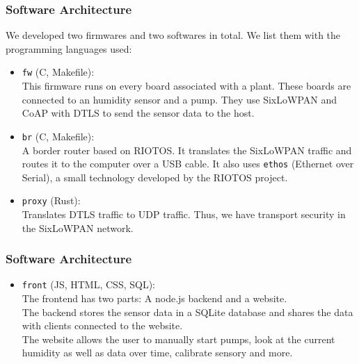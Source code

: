 \documentclass[10pt, xcolor=svgnames]{beamer}
\begin{document}
\begin{frame}
    \frametitle{Software Architecture}

    We developed two firmwares and two softwares in total. We list them with the programming languages used:

    \begin{itemize}
        \item \texttt{fw} (C, Makefile): \\
            This firmware runs on every board associated with a plant. These boards are connected to an humidity sensor and a pump. They use SixLoWPAN and CoAP with DTLS to send the sensor data to the host.
            
        \item \texttt{br} (C, Makefile): \\
            A border router based on RIOTOS. It translates the SixLoWPAN traffic and routes it to the computer over a USB cable. It also uses \texttt{ethos} (Ethernet over Serial), a small technology developed by the RIOTOS project.
            
        \item \texttt{proxy} (Rust): \\
            Translates DTLS traffic to UDP traffic. Thus, we have transport security in the SixLoWPAN network.
    \end{itemize}
\end{frame}

\begin{frame}
    \frametitle{Software Architecture}
    
    \begin{itemize}
        \item \texttt{front} (JS, HTML, CSS, SQL): \\
            The frontend has two parts: A node.js backend and a website. \\
            The backend stores the sensor data in a SQLite database and shares the data with clients connected to the website. \\
            The website allows the user to manually start pumps, look at the current humidity as well as data over time, calibrate sensory and more.
    \end{itemize}
\end{frame}
\end{document}
